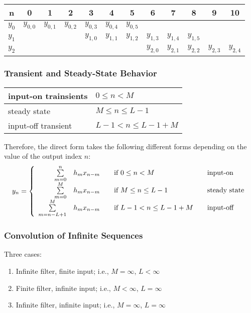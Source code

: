 \begin{tabular}{c|ccccccccccc}
	n & 0 & 1 & 2 & 3 & 4 & 5 & 6 & 7 & 8 & 9 & 10 \\
	\hline
	$y_0$ & $y_{0,0}$ & $y_{0,1}$ & $y_{0,2}$ & $y_{0,3}$ & $y_{0,4}$ & $y_{0,5}$ &
	& & & &\\
	$y_1$ & & & & $y_{1,0}$ & $y_{1,1}$ & $y_{1,2}$ & $y_{1,3}$ & $y_{1,4}$ &
	$y_{1,5}$ & & \\
	$y_2$ & & & & & & & $y_{2,0}$ & $y_{2,1}$ & $y_{2,2}$ & $y_{2,3}$ & $y_{2,4}$
	\\
	\hline
\end{tabular}


\subsubsection{Transient and Steady-State Behavior}
\begin{tabular}{|l|l|}
	\hline
	input-on trainsients	& $ 0 \leq n < M $
	\\ \hline
	steady state			& $ M \leq n \leq L-1 $
	\\ \hline
	input-off transient		& $ L-1 < n \leq L-1+M $
	\\ \hline
\end{tabular}\newline

Therefore, the direct form takes the following different forms depending
on the value of the output index $n$:
\[
	y_n =
		\left\{
			\begin{array}{r l l l}
				\sum\limits_{m=0}^{n} & h_m x_{n-m}		& \quad \text{if } 0 \leq n < M			& \quad \text{input-on} \\
				\sum\limits_{m=0}^{M} & h_m x_{n-m}		& \quad \text{if } M \leq n \leq L-1	& \quad \text{steady state} \\
				\sum\limits_{m=n-L+1}^{M} & h_m x_{n-m}	& \quad \text{if } L-1 < n \leq L-1+M	& \quad \text{input-off}
			\end{array}
		\right.
\]


\subsubsection{Convolution of Infinite Sequences}
Three cases:
\begin{enumerate}
  \item Infinite filter, finite input; i.e., $M = \infty$, $L < \infty$
  \item Finite filter, infinite input; i.e., $M < \infty$, $L = \infty$
  \item Infinite filter, infinite input; i.e., $M = \infty$, $L = \infty$
\end{enumerate}
\resetArrayStretch

